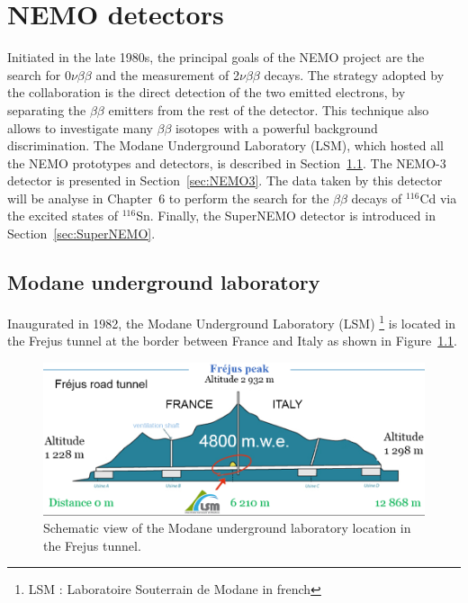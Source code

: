 \documentclass[main.tex]{subfiles}
\begin{document}
\chapter{NEMO detectors}\label{chap:NEMO}




\NI Initiated in the late 1980s, the principal goals of the NEMO project are the search for 0$\nu\beta\beta$ and the measurement of 2$\nu\beta\beta$ decays. The strategy adopted by the collaboration is the direct detection of the two emitted electrons, by separating the $\beta\beta$ emitters from the rest of the detector. This technique also allows to investigate many $\beta\beta$ isotopes with a powerful background discrimination. The Modane Underground Laboratory (LSM), which hosted all the NEMO prototypes and detectors, is described in Section~\ref{sec:LSM}. The NEMO-3 detector is presented in Section~\ref{sec:NEMO3}. The data taken by this detector will be analyse in Chapter~6 to perform the search for the $\beta\beta$ decays of $^{\text{116}}$Cd via the excited states of $^{\text{116}}$Sn. Finally, the SuperNEMO detector is introduced in Section~\ref{sec:SuperNEMO}.


\section{Modane underground laboratory}\label{sec:LSM}


\NI Inaugurated in 1982, the Modane Underground Laboratory (LSM) \footnote{LSM : Laboratoire Souterrain de Modane in french} is located in the Frejus tunnel at the border between France and Italy as shown in Figure~\ref{LSMtunnel}.


\begin{figure}[h!]
\begin{center}
\includegraphics[scale=0.35]{pictures/Chap3/LSMtunnel.png}
\caption{Schematic view of the Modane underground laboratory location in the Frejus tunnel.}
\label{LSMtunnel}
\end{center}
\end{figure}
\end{document}
